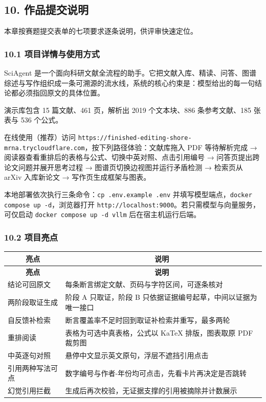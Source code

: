\documentclass[UTF8,fontset=windows,zihao=5,a4paper]{ctexart}
\begin{document}
\subsection*{10. 作品提交说明}
本章按赛题提交表单的七项要求逐条说明，供评审快速定位。

\subsubsection*{10.1 项目详情与使用方式}
SciAgent 是一个面向科研文献全流程的助手。它把文献入库、精读、问答、图谱综述与写作组织成一条可溯源的流水线，系统的核心约束是：模型给出的每一句结论都必须指回原文的具体位置。

演示库包含 15 篇文献、461 页，解析出 2019 个文本块、886 条参考文献、185 张表与 536 个公式。

在线使用（推荐）访问 \texttt{https://finished-editing-shore-mrna.trycloudflare.com}，按下列路径体验：文献库拖入 PDF 等待解析完成 → 阅读器查看重排后的表格与公式、切换中英对照、点击引用编号 → 问答页提出跨论文问题并展开思考过程 → 图谱页切换边视图并运行矛盾检测 → 检索页从 arXiv 入库新论文 → 写作页生成框架与图表。

本地部署依次执行三条命令：\texttt{cp .env.example .env} 并填写模型端点，\texttt{docker compose up -d}，浏览器打开 \texttt{http://localhost:9000}。若只需模型与向量服务，可仅启动 \texttt{docker compose up -d vllm} 后在宿主机运行后端。

\subsubsection*{10.2 项目亮点}
\begin{longtable}{@{}p{}p{}@{}}
\toprule
\multicolumn{1}{c}{\textbf{亮点}} & \multicolumn{1}{c}{\textbf{说明}} \\
\midrule
\endfirsthead
\toprule
\multicolumn{1}{c}{\textbf{亮点}} & \multicolumn{1}{c}{\textbf{说明}} \\
\midrule
\endhead
\bottomrule
\endfoot
结论可回原文 & 每条断言绑定文献、页码与字符区间，可逐条核对 \\
两阶段取证生成 & 阶段 A 只取证，阶段 B 只依据证据编号起草，中间以证据为唯一接口 \\
自反馈补检索 & 断言覆盖率不足时回到取证补检索并重写，最多两轮 \\
重排阅读 & 表格为可选中真表格，公式以 KaTeX 排版，图表取原 PDF 裁剪图 \\
中英逐句对照 & 悬停中文显示英文原句，浮层不遮挡引用点击 \\
引用两种写法可点 & 数字编号与作者-年份均可点击，先看卡片再决定是否跳转 \\
幻觉引用拦截 & 生成后再次校验，无证据支撑的引用被摘除并计数展示 \\
\end{longtable}
\end{document}
